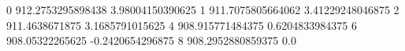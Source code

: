 0 912.2753295898438 3.98004150390625
1 911.7075805664062 3.41229248046875
2 911.4638671875 3.1685791015625
4 908.915771484375 0.6204833984375
6 908.05322265625 -0.2420654296875
8 908.2952880859375 0.0
